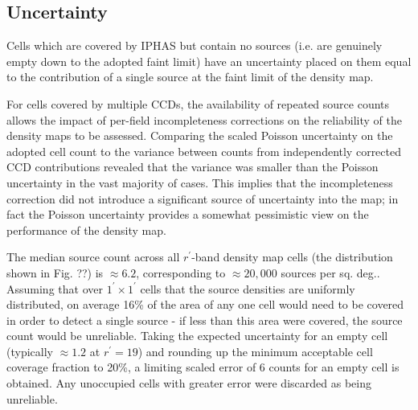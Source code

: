 \documentclass[a4paper,useAMS,usenatbib]{mn2e}
\begin{document}
\subsection{Uncertainty}
Cells which are covered by IPHAS but contain no sources (i.e. are genuinely empty down to the adopted faint limit) have an uncertainty placed on them equal to the contribution of a single source at the faint limit of the density map.

For cells covered by multiple CCDs, the availability of repeated source counts allows the impact of per-field incompleteness corrections on the reliability of the density maps to be assessed. Comparing the scaled Poisson uncertainty on the adopted cell count to the variance between counts from independently corrected CCD contributions revealed that the variance was smaller than the Poisson uncertainty in the vast majority of cases. This implies that the incompleteness correction did not introduce a significant source of uncertainty into the map; in fact the Poisson uncertainty provides a somewhat pessimistic view on the performance of the density map.

The median source count across all $r^{\prime}$-band density map cells (the distribution shown in Fig. ??) is $\approx6.2$, corresponding to $\approx20,000$ sources per sq. deg.. Assuming that over $1^{\prime}\times1^{\prime}$ cells that the source densities are uniformly distributed, on average 16\% of the area of any one cell would need to be covered in order to detect a single source - if less than this area were covered, the source count would be unreliable. Taking the expected uncertainty for an empty cell (typically $\approx1.2$ at $r^{\prime}=19$) and rounding up the minimum acceptable cell coverage fraction to 20\%, a limiting scaled error of 6 counts for an empty cell is obtained. Any unoccupied cells with greater error were discarded as being unreliable.
\end{document}
